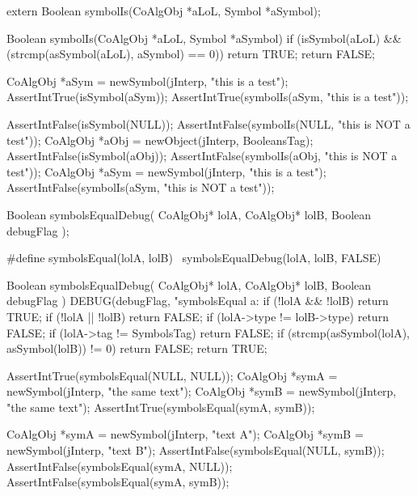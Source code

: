 \startCHeader
extern Boolean symbolIs(CoAlgObj *aLoL, Symbol *aSymbol);
\stopCHeader

\startCCode
Boolean symbolIs(CoAlgObj *aLoL, Symbol *aSymbol) {
  if (isSymbol(aLoL) &&
      (strcmp(asSymbol(aLoL), aSymbol) == 0)) {
    return TRUE;
  }
  return FALSE;
}
\stopCCode


\startCTest
  CoAlgObj *aSym = newSymbol(jInterp, "this is a test");
  AssertIntTrue(isSymbol(aSym));
  AssertIntTrue(symbolIs(aSym, "this is a test"));
\stopCTest
\stopTestCase

\startCTest
  AssertIntFalse(isSymbol(NULL));
  AssertIntFalse(symbolIs(NULL, "this is NOT a test"));
  CoAlgObj *aObj = newObject(jInterp, BooleansTag);
  AssertIntFalse(isSymbol(aObj));
  AssertIntFalse(symbolIs(aObj, "this is NOT a test"));
  CoAlgObj *aSym = newSymbol(jInterp, "this is a test");
  AssertIntFalse(symbolIs(aSym, "this is NOT a test"));
\stopCTest
\stopTestCase
\stopTestSuite


\startCHeader
Boolean symbolsEqualDebug(
  CoAlgObj* lolA,
  CoAlgObj* lolB,
  Boolean debugFlag
);

#define symbolsEqual(lolA, lolB) \
  symbolsEqualDebug(lolA, lolB, FALSE)
\stopCHeader

\startCCode
Boolean symbolsEqualDebug(
  CoAlgObj* lolA,
  CoAlgObj* lolB,
  Boolean debugFlag
) {
  DEBUG(debugFlag, "symbolsEqual a:%
  if (!lolA && !lolB) return TRUE;
  if (!lolA || !lolB) return FALSE;
  if (lolA->type != lolB->type) return FALSE;
  if (lolA->tag != SymbolsTag) return FALSE;
  if (strcmp(asSymbol(lolA), asSymbol(lolB)) != 0) return FALSE;
  return TRUE;
}
\stopCCode


\startCTest
  AssertIntTrue(symbolsEqual(NULL, NULL));
  CoAlgObj *symA = newSymbol(jInterp, "the same text");
  CoAlgObj *symB = newSymbol(jInterp, "the same text");
  AssertIntTrue(symbolsEqual(symA, symB));
\stopCTest
\stopTestCase


\startCTest
  CoAlgObj *symA = newSymbol(jInterp, "text A");
  CoAlgObj *symB = newSymbol(jInterp, "text B");
  AssertIntFalse(symbolsEqual(NULL, symB));
  AssertIntFalse(symbolsEqual(symA, NULL));
  AssertIntFalse(symbolsEqual(symA, symB));
\stopCTest
\stopTestCase
\stopTestSuite


